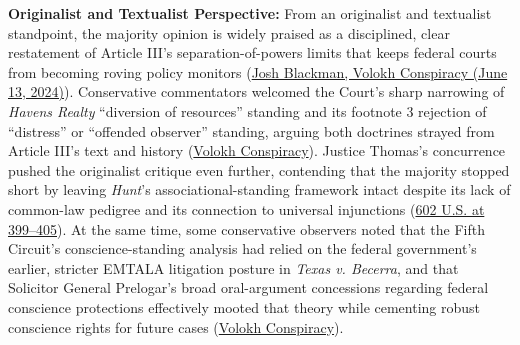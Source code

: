 \documentclass[12pt]{article}
\begin{document}
\textbf{Originalist and Textualist Perspective:} From an originalist and textualist standpoint, the majority opinion is widely praised as a disciplined, clear restatement of Article III's separation-of-powers limits that keeps federal courts from becoming roving policy monitors (\href{https://reason.com/volokh/2024/06/13/the-standing-analysis-in-fda-v-alliance-for-hippocratic-medicine/}{Josh Blackman, Volokh Conspiracy (June 13, 2024)}). Conservative commentators welcomed the Court's sharp narrowing of \textit{Havens Realty} ``diversion of resources'' standing and its footnote 3 rejection of ``distress'' or ``offended observer'' standing, arguing both doctrines strayed from Article III's text and history (\href{https://reason.com/volokh/2024/06/13/the-standing-analysis-in-fda-v-alliance-for-hippocratic-medicine/}{Volokh Conspiracy}). Justice Thomas's concurrence pushed the originalist critique even further, contending that the majority stopped short by leaving \textit{Hunt}'s associational-standing framework intact despite its lack of common-law pedigree and its connection to universal injunctions (\href{https://www.supremecourt.gov/opinions/23pdf/602us1r35_bqmd.pdf}{602 U.S. at 399--405}). At the same time, some conservative observers noted that the Fifth Circuit's conscience-standing analysis had relied on the federal government's earlier, stricter EMTALA litigation posture in \textit{Texas v. Becerra}, and that Solicitor General Prelogar's broad oral-argument concessions regarding federal conscience protections effectively mooted that theory while cementing robust conscience rights for future cases (\href{https://reason.com/volokh/2024/06/13/the-standing-analysis-in-fda-v-alliance-for-hippocratic-medicine/}{Volokh Conspiracy}).
\end{document}
